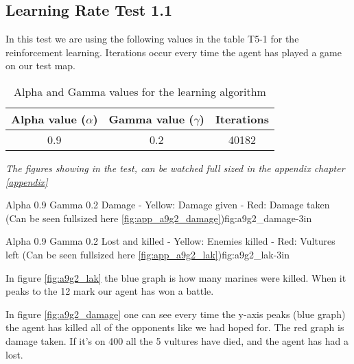 \subsection*{Learning Rate Test 1.1}
In this test we are using the following values in the table T5-1 for the reinforcement learning. Iterations occur every time the agent has played a game on our test map.

\begin{centering}
\begin{table}[H]
 \begin{tabular}{|c|c|c|}
	\hline
		Alpha value ($\alpha$) & Gamma value ($\gamma$) & Iterations\\
	\hline
		0.9 & 0.2 & 40182 \\
	\hline
\end{tabular}
\label{tab:agtable}
\caption{Alpha and Gamma values for the learning algorithm}
\end{table}
\end{centering}


\textit{The figures showing in the test, can be watched full sized in the appendix chapter \ref{appendix}} 

			{Alpha 0.9 Gamma 0.2 Damage - Yellow: Damage given - Red: Damage taken (Can be seen fullsized here \ref{fig:app_a9g2_damage})}{fig:a9g2_damage}{-3in}

			{Alpha 0.9 Gamma 0.2 Lost and killed - Yellow: Enemies killed - Red: Vultures left (Can be seen fullsized here \ref{fig:app_a9g2_lak})}{fig:a9g2_lak}{-3in}
			
			
In figure \ref{fig:a9g2_lak} the blue graph is how many marines were killed. When it peaks to the 12 mark our agent has won a battle.




In figure \ref{fig:a9g2_damage} one can see every time the y-axis peaks (blue graph) the agent has killed all of the opponents like we had hoped for. The red graph is damage taken. If it's on 400 all the 5 vultures have died, and the agent has had a lost.

